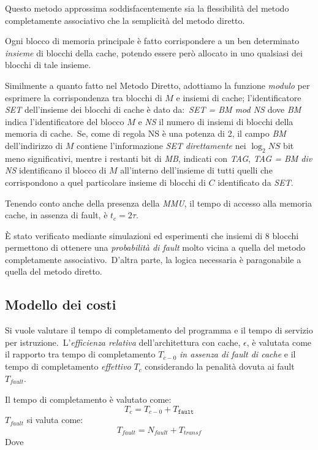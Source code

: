 Questo metodo approssima soddisfacentemente sia la flessibilità del metodo completamente associativo che la semplicità del metodo diretto.

Ogni blocco di memoria principale è fatto corrispondere a un ben determinato \textit{insieme} di blocchi della cache, potendo essere però allocato in uno qualsiasi dei blocchi di tale insieme.

Similmente a quanto fatto nel Metodo Diretto, adottiamo la funzione \textit{modulo} per esprimere la corrispondenza tra blocchi di $M$ e insiemi di cache; l'identificatore \textit{SET} dell'insieme dei blocchi di cache è dato da:\ \textit{SET = BM mod NS} dove \textit{BM} indica l'identificatore del blocco $M$ e \textit{NS} il numero di insiemi di blocchi della memoria di cache.\
Se, come di regola NS è una potenza di 2, il campo \textit{BM} dell'indirizzo di $M$ contiene l'informazione \textit{SET} \textit{direttamente} nei $\log_2NS$ bit meno significativi, mentre i restanti bit di \textit{MB}, indicati con \textit{TAG}, \textit{TAG = BM div NS} identificano il blocco di $M$ all'interno dell'insieme di tutti quelli che corrispondono a quel particolare insieme di blocchi di $C$ identificato da \textit{SET}.

Tenendo conto anche della presenza della \textit{MMU}, il tempo di accesso alla memoria cache, in assenza di fault, è $t_c = 2\tau$.

È stato verificato mediante simulazioni ed esperimenti che insiemi di 8 blocchi permettono di ottenere una \textit{probabilità di fault} molto vicina a quella del metodo completamente associativo.\
D'altra parte, la logica necessaria è paragonabile a quella del metodo diretto.

\subsection{Modello dei costi}

Si vuole valutare il tempo di completamento del programma e il tempo di servizio per istruzione.\
L'\textit{efficienza relativa} dell'architettura con cache, $\epsilon$, è valutata come il rapporto tra tempo di completamento $T_{c-0}$ \textit{in assenza di fault di cache} e il tempo di completamento \textit{effettivo} $T_c$ considerando la penalità dovuta ai fault $T_{\mathit{fault}}$.

Il tempo di completamento è valutato come:\ \[T_c = T_{c-0} + T_{\mathtt{fault}}\]
$T_{\mathit{fault}}$ si valuta come:\ \[T_{\mathit{fault}} = N_{\mathit{fault}} + T_{\mathit{transf}}\]
Dove

